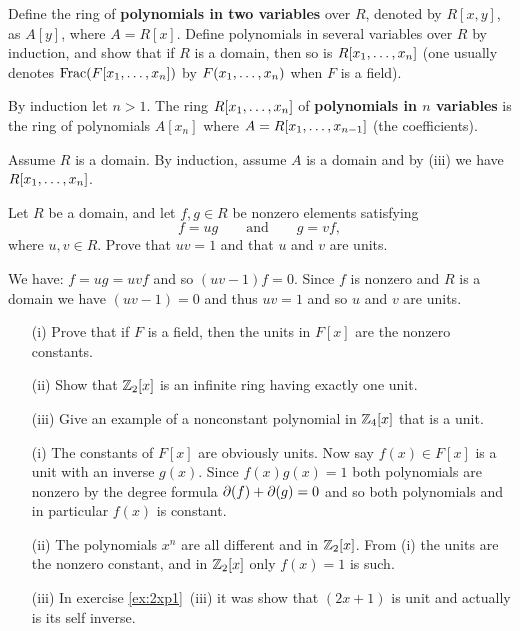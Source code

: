 \begin{myenumerate}
\item
\begin{excopy}
Define the ring of \textbf{polynomials in two variables} over $R$,
denoted by \(R[x,y]\), as \(A[y]\), where \(A=R[x]\).
Define polynomials in several variables over $R$ by induction, and show that
if $R$ is a domain, then so is \(R[x_1,\ldots,x_{n}]\) (one usually denotes
\(\mathop{\rm Frac}\nolimits(F[x_1,\ldots,x_n])\) by \(F(x_1,\ldots,x_{n})\) when $F$ is a field).
\end{excopy}

By induction let \(n > 1\). The ring \(R[x_1,\ldots,x_{n}]\) of
\textbf{polynomials in $n$ variables} is the ring of polynomials
\(A[x_n]\) where \(A=R[x_1,\ldots,x_{n-1}]\) (the coefficients).

Assume $R$ is a domain. By induction, assume $A$ is a domain
and by (iii) we have \(R[x_1,\ldots,x_{n}]\).

\item
\begin{excopy}
Let $R$ be a domain, and let \(f,g\in R\) be nonzero elements satisfying
\[f=ug  \qquad\textrm{and}\qquad g=vf,\]
where \(u,v\in R\). Prove that \(uv=1\) and that $u$ and $v$ are units.
\end{excopy}

We have: \(f=ug=uvf\) and so \((uv-1)f=0\). Since $f$ is nonzero
and $R$ is a domain we have \((uv-1)=0\) and thus \(uv=1\)
and so  $u$ and $v$ are units.

\item
\begin{excopy}
\begin{itemize}
 \item[(i)]
   Prove that if $F$ is a field, then the units in \(F[x]\) are the nonzero
   constants.
 \item[(ii)]
   Show that \(\mathbb{Z}_2[x]\) is an infinite ring having exactly one unit.
 \item[(iii)]
   Give an example of a nonconstant polynomial in \(\mathbb{Z}_4[x]\)
   that is a unit.
\end{itemize}
\end{excopy}

\begin{itemize}
 \item[(i)]
    The constants of \(F[x]\) are obviously units.
    Now say \(f(x)\in F[x]\) is a unit with an inverse \(g(x)\).
    Since \(f(x)g(x)=1\) both polynomials are nonzero
    by the degree formula \(\partial(f)+\partial(g)=0\)
    and so both polynomials and in particular \(f(x)\) is constant.
 \item[(ii)]
    The polynomials \(x^n\) are all different and in \(\mathbb{Z}_2[x]\).
    From (i) the units are the nonzero constant, and in \(\mathbb{Z}_2[x]\)
    only \(f(x)=1\) is such.
 \item[(iii)]
    In exercise \ref{ex:2xp1}~(iii) it was show that \((2x+1)\) is unit
    and actually is its self inverse.
\end{itemize}


\end{myenumerate}
